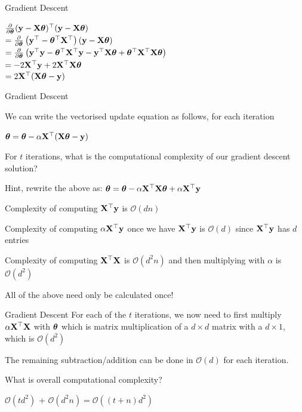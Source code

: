 \documentclass[usenames,dvipsnames]{beamer}
\begin{document}
\begin{frame}{Gradient Descent}


\(\frac{\partial}{\partial \boldsymbol{\theta}}(\mathbf{y}-\mathbf{X} \boldsymbol{\theta})^{\top}(\mathbf{y}-\mathbf{X} \boldsymbol{\theta})\)
\\ \(=\frac{\partial}{\partial \boldsymbol{\theta}}\left(\mathbf{y}^{\top}-\boldsymbol{\theta}^{\top} \mathbf{X}^{\top}\right)(\mathbf{y}-\mathbf{X} \boldsymbol{\theta})\)
\\ \(=\frac{\partial}{\partial \boldsymbol{\theta}}\left(\mathbf{y}^{\top} \mathbf{y}-\boldsymbol{\theta}^{\top} \mathbf{X}^{\top} \mathbf{y}-\mathbf{y}^{\top} \mathbf{X} \boldsymbol{\theta}+\boldsymbol{\theta}^{\top} \mathbf{X}^{\top} \mathbf{X} \boldsymbol{\theta}\right)\)
\\ \(=-2 \mathbf{X}^{\top} \mathbf{y}+2 \mathbf{X}^{\top} \mathbf{X} \boldsymbol{\theta}\)
\\ \(=2 \mathbf{X}^{\top}(\mathbf{X} \boldsymbol{\theta}-\mathbf{y})\)
	

\end{frame}

\begin{frame}{Gradient Descent}


We can write the vectorised update equation as follows, for each iteration

\(\boldsymbol{\theta}=\boldsymbol{\theta} - \alpha \mathbf{X}^{\top}(\mathbf{X} \boldsymbol{\theta}-\mathbf{y})\) 


\pause For $t$ iterations, what is the computational complexity of our gradient descent solution?

\pause Hint, rewrite the above as: \(\boldsymbol{\theta}=\boldsymbol{\theta} - \alpha \mathbf{X}^{\top}\mathbf{X} \boldsymbol{\theta}+ \alpha \mathbf{X}^{\top}\mathbf{y}\) 

\pause Complexity of computing $\mathbf{X}^{\top}\mathbf{y}$ is $\mathcal{O}(dn)$

\pause Complexity of computing $\alpha \mathbf{X}^{\top}\mathbf{y}$ once we have $\mathbf{X}^{\top}\mathbf{y}$ is $\mathcal{O}(d)$ since $\mathbf{X}^{\top}\mathbf{y}$ has $d$ entries

\pause Complexity of computing $\mathbf{X}^{\top}\mathbf{X}$ is $\mathcal{O}(d^2n)$ and then multiplying with $\alpha$ is $\mathcal{O}(d^2)$

\pause All of the above need only be calculated once!



\end{frame}



\begin{frame}{Gradient Descent}
\pause For each of the $t$ iterations, we now need to first multiply $\alpha \mathbf{X}^{\top}\mathbf{X}$ with $\boldsymbol{\theta}$ which is matrix multiplication of a $d \times d$ matrix with a $d \times 1$, which is $\mathcal{O}(d^2)$ 

\pause The remaining subtraction/addition can be done in $\mathcal{O}(d)$ for each iteration.

\pause What is overall computational complexity?

\pause $\mathcal{O}(td^2)$ + $\mathcal{O}(d^2n) = \mathcal{O}((t+n)d^2)$
\end{frame}
\end{document}
